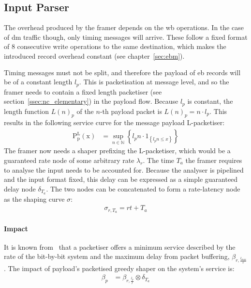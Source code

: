 \subsection{Input Parser}
The overhead produced by the framer depends on the \gls{wb} operations. In the case of \gls{dm} traffic though, only timing messages will arrive.
These follow a fixed format of 8 consecutive write operations to the same destination, which makes the introduced record overhead constant (see chapter~\ref{sec:ebm}).
\par
Timing messages must not be split, and therefore the payload of \gls{eb} records will be of a constant length $l_p$.
This is packetisation at message level, and so the framer needs to contain a fixed length packetiser (see section~\ref{ssec:nc_elementary}) in the payload flow.
Because $l_p$ is constant, the length function $L(n)_p$ of the $n$-th payload packet is $L(n)_p = n \cdot l_p$.
This results in the following service curve for the message payload L-packetiser:
%
\begin{align}
\mathrm{P^L_{p}(x)} &= \sup_{n \in \mathbb{N}}\left\{ l_p n \cdot 1_{\left\{l_p n\le x\right\}}\right\}
\label{eq:lpac_p_framer}
\end{align}
%
The framer now needs a shaper prefixing the L-packetiser, which would be a guaranteed rate node of some arbitrary rate $\lambda_r$. 
The time $T_a$ the framer requires to analyse the input needs to be accounted for. Because the analyser is pipelined
and the input format fixed, this delay can be expressed as a simple guaranteed delay node $\delta_{T_a}$. The two nodes can be concatenated to form a rate-latency node as the shaping curve $\sigma$:
%
\begin{equation}
\begin{aligned}
\sigma_{r, T_a} = rt + T_a
\label{eq:lpac_p_sigma}
\end{aligned}
\end{equation}
%
\paragraph{Impact}
It is known from~\cite[p. 43]{thiran_network_2001} that a packetiser offers a minimum service described by the rate of the bit-by-bit system and 
the maximum delay from packet buffering, $\beta_{r,\frac{l_{max}}{r}}$. The impact of payload's packetised greedy shaper on the system's service is:
%
\begin{equation}
\begin{aligned}
\beta_{p}  &= \beta_{r,\frac{l_p}{r}} \otimes \delta_{T_a}
\label{eq:lpac_p_beta}
\end{aligned}
\end{equation}
%
